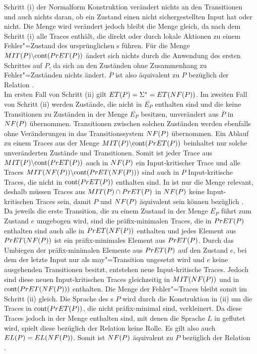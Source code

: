 Schritt (i) der Normalform Konstruktion verändert nichts an den Transitionen
und auch nichts daran, ob ein Zustand einen nicht sichergestellten Input hat
oder nicht. Die Menge \StET{} wird verändert jedoch bleibt die Menge \PrET{}
gleich, da \StET{} nach dem Schritt (i) alle Traces enthält, die direkt oder
durch lokale Aktionen zu einem Fehler"=Zustand des ursprünglichen \MEIO{}s
führen. Für die Menge $MIT (P)\backslash\mathrm{cont} (PrET (P))$ ändert sich nichts
durch die Anwendung des ersten Schrittes auf $P$, da sich an den Zuständen ohne
Zusammenhang zu Fehler"=Zuständen nichts ändert. $\overline{P}$ ist also
äquivalent zu $P$ bezüglich der Relation \ERel{}.\\
Im ersten Fall von Schritt (ii) gilt $ET (P) = \Sigma ^* = ET (NF (P))$. Im
zweiten Fall von Schritt (ii) werden Zustände, die nicht in $\overline{E_P}$
enthalten sind und die keine Transitionen zu Zuständen in der Menge
$\overline{E_P}$ besitzen, unverändert aus $\overline{P}$ in $NF (P)$
übernommen. Transitionen zwischen solchen Zuständen werden ebenfalls ohne
Veränderungen in das Transitionssystem $NF (P)$ übernommen. Ein Ablauf zu
einem Traces aus der Menge $MIT (P)\backslash\mathrm{cont} (PrET (P))$ beinhaltet nur
solche unveränderten Zustände und Transitionen. Somit ist jeder Trace aus $MIT
(P)\backslash\mathrm{cont} (PrET (P))$ auch in $NF (P)$ ein Input-kritischer Trace
und alle Traces $MIT (NF (P))\backslash\mathrm{cont} (PrET (NF (P)))$ sind auch in
$P$ Input-kritische Traces, die nicht in $\mathrm{cont} (PrET (P))$ enthalten sind. In
\ERel{} ist nur die Menge \ET{} relevant, deshalb müssen Traces aus $MIT
(P)\cap PrET (P)$ in $NF (P)$ keine Input-kritischen Traces sein, damit $P$
und $NF (P)$ äquivalent sein können bezüglich \ERel{}. Da jeweils die erste
Transition, die zu einem Zustand in der Menge $\overline{E _P}$ führt zum
Zustand $e$ umgebogen wird, sind die präfix-minimalen Traces, die in $PrET
(P)$ enthalten sind auch alle in $PrET (NF (P))$ enthalten und jedes Element
aus $PrET (NF (P))$ ist ein präfix-minimales Element aus $PrET (P)$. Durch
das Umbiegen der präfix-minimalen Elemente aus $PrET (P)$ auf den Zustand $e$,
bei dem der letzte Input nur als may"=Transition ungesetzt wird und $e$ keine
ausgehenden Transitionen besitzt, entstehen neue Input-kritische Traces. Jedoch
sind diese neuen Input-kritischen Traces gleichzeitig in $MIT (NF (P))$ und
in $\mathrm{cont} (PrET (NF (P)))$ enthalten. Die Menge der Fehler"=Traces \ET{}
bleibt somit im Schritt (ii) gleich. Die Sprache des \MEIO{}s $P$ wird durch
die Konstruktion in (ii) um die Traces in $\mathrm{cont} (PrET (P))$, die nicht
präfix-minimal sind, verkleinert. Da diese Traces jedoch in der Menge \ET{}
enthalten sind, mit denen die Sprache $L$ in \EL{} geflutet wird, spielt diese
bezüglich der Relation \ERel{} keine Rolle. Es gilt also auch $EL (P) = EL
(NF (P))$. Somit ist $NF (P)$ äquivalent zu $P$ bezüglich der Relation \ERel{}.

